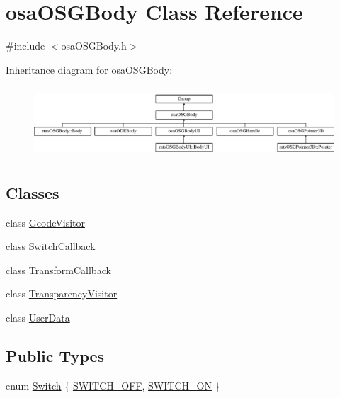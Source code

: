 \hypertarget{classosa_o_s_g_body}{}\section{osa\+O\+S\+G\+Body Class Reference}
\label{classosa_o_s_g_body}


{\ttfamily \#include $<$osa\+O\+S\+G\+Body.\+h$>$}

Inheritance diagram for osa\+O\+S\+G\+Body\+:\begin{figure}[H]
\begin{center}
\leavevmode
\includegraphics[height=2.682635cm]{dc/d33/classosa_o_s_g_body}
\end{center}
\end{figure}
\subsection*{Classes}
\begin{DoxyCompactItemize}
\item 
class \hyperlink{classosa_o_s_g_body_1_1_geode_visitor}{Geode\+Visitor}
\item 
class \hyperlink{classosa_o_s_g_body_1_1_switch_callback}{Switch\+Callback}
\item 
class \hyperlink{classosa_o_s_g_body_1_1_transform_callback}{Transform\+Callback}
\item 
class \hyperlink{classosa_o_s_g_body_1_1_transparency_visitor}{Transparency\+Visitor}
\item 
class \hyperlink{classosa_o_s_g_body_1_1_user_data}{User\+Data}
\end{DoxyCompactItemize}
\subsection*{Public Types}
\begin{DoxyCompactItemize}
\item 
enum \hyperlink{classosa_o_s_g_body_a1820a6192991316ef8fdeb216538c370}{Switch} \{ \hyperlink{classosa_o_s_g_body_a1820a6192991316ef8fdeb216538c370ad9dd31dcffcf0953ed5d0f3395926afd}{S\+W\+I\+T\+C\+H\+\_\+\+O\+F\+F}, 
\hyperlink{classosa_o_s_g_body_a1820a6192991316ef8fdeb216538c370a35ca6cc64839a59fcc2091c704aa4f4b}{S\+W\+I\+T\+C\+H\+\_\+\+O\+N}
 \}
\end{DoxyCompactItemize}
